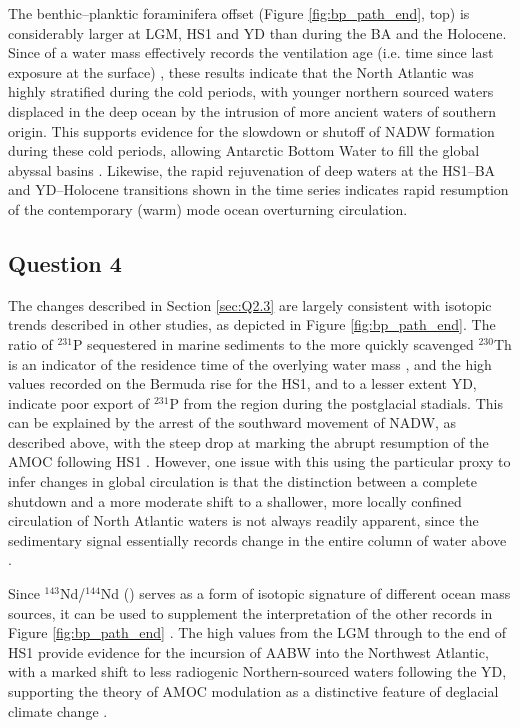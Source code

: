 The benthic--planktic foraminifera \fC{} offset (Figure \ref{fig:bp_path_end}, top) is considerably larger at LGM, HS1 and YD than during the BA and the Holocene.
Since \BP{} of a water mass effectively records the ventilation age (i.e. time since last exposure at the surface) \parencite{lynch2014tracers}, these results indicate that the North Atlantic was highly stratified during the cold periods, with younger northern sourced waters displaced in the deep ocean by the intrusion of more ancient waters of southern origin.
This supports evidence for the slowdown or shutoff of NADW formation during these cold periods, allowing Antarctic Bottom Water to fill the global abyssal basins \parencite{boyle1985comparison, bard1994north, thornalley2011deglacial}.
Likewise, the rapid rejuvenation of deep waters at the HS1--BA and YD--Holocene transitions shown in the \BP{} time series indicates rapid resumption of the contemporary (warm) mode ocean overturning circulation.

\subsection{Question 4}
\label{sec:Q2.4}
The \BP{} changes described in Section \ref{sec:Q2.3} are largely consistent with isotopic trends described in other studies, as depicted in Figure \ref{fig:bp_path_end}.
The ratio of $^{231}$P sequestered in marine sediments to the more quickly scavenged $^{230}$Th is an indicator of the residence time of the overlying water mass \parencite{lynch2014tracers}, and the high values recorded on the Bermuda rise for the HS1, and to a lesser extent YD, indicate poor export of $^{231}$P from the region during the postglacial stadials.
This can be explained by the arrest of the southward movement of NADW, as described above, with the steep \PaTh{} drop at  marking the abrupt resumption of the AMOC following HS1 \parencite{mcmanus2004collapse}.
However, one issue with this using the particular proxy to infer changes in global circulation is that the distinction between a complete shutdown and a more moderate shift to a shallower, more locally confined circulation of North Atlantic waters is not always readily apparent, since the sedimentary \PaTh{} signal essentially records change in the entire column of water above \parencite{roberts2010synchronous}. 

Since $^{143}$Nd/$^{144}$Nd (\eNd{}) serves as a form of isotopic signature of different ocean mass sources, it can be used to supplement the interpretation of the other records in Figure \ref{fig:bp_path_end} \parencite{lynch2014tracers}. 
The high values from the LGM through to the end of HS1 provide evidence for the incursion of AABW into the Northwest Atlantic, with a marked shift to less radiogenic Northern-sourced waters following the YD, supporting the theory of AMOC modulation as a distinctive feature of deglacial climate change \parencite{roberts2010synchronous}.

